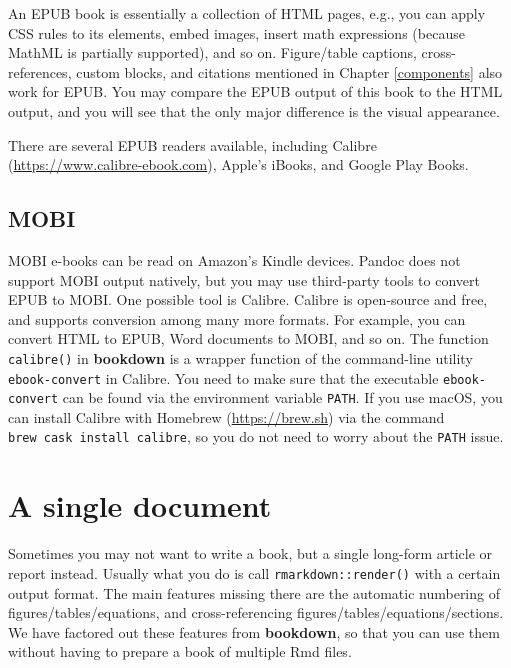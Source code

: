 \documentclass[
  12pt,
]{krantz}
\theoremstyle{definition}
\theoremstyle{definition}
\theoremstyle{definition}
\theoremstyle{definition}
\theoremstyle{remark}
\begin{document}
An EPUB book is essentially a collection of HTML pages, e.g., you can apply CSS rules to its elements, embed images, insert math expressions (because MathML is partially supported), and so on. Figure/table captions, cross-references, custom blocks, and citations mentioned in Chapter \ref{components} also work for EPUB. You may compare the EPUB output of this book to the HTML output, and you will see that the only major difference is the visual appearance.

There are several EPUB readers available, including Calibre (\url{https://www.calibre-ebook.com}), Apple's iBooks, and Google Play Books.

\hypertarget{mobi}{%
\subsection{MOBI}\label{mobi}}

MOBI e-books can be read on Amazon's Kindle devices. Pandoc does not support MOBI output natively, but you may use third-party tools to convert EPUB to MOBI. One possible tool is Calibre. Calibre is open-source and free, and supports conversion among many more formats. For example, you can convert HTML to EPUB, Word documents to MOBI, and so on. The function \texttt{calibre()} in \textbf{bookdown} is a wrapper function of the command-line utility \texttt{ebook-convert} in Calibre. You need to make sure that the executable \texttt{ebook-convert} can be found via the environment variable \texttt{PATH}. If you use macOS, you can install Calibre with Homebrew (\url{https://brew.sh}) via the command \texttt{brew\ cask\ install\ calibre}, so you do not need to worry about the \texttt{PATH} issue.

\hypertarget{a-single-document}{%
\section{A single document}\label{a-single-document}}

Sometimes you may not want to write a book, but a single long-form article or report instead. Usually what you do is call \texttt{rmarkdown::render()} with a certain output format. The main features missing there are the automatic numbering of figures/tables/equations, and cross-referencing figures/tables/equations/sections. We have factored out these features from \textbf{bookdown}, so that you can use them without having to prepare a book of multiple Rmd files.
\end{document}
